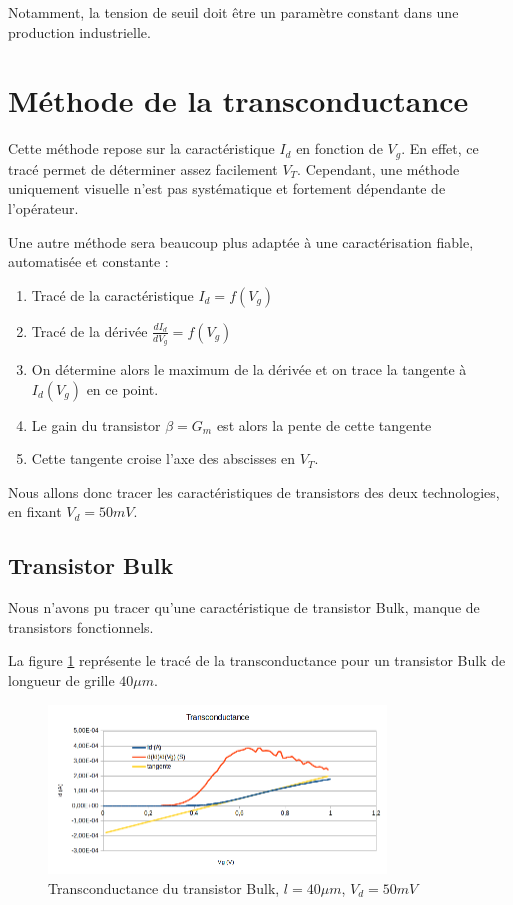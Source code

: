 \documentclass[a4paper,11pt]{report}
\begin{document}
Notamment, la tension de seuil doit être un paramètre constant dans une production industrielle.

\section{Méthode de la transconductance}
Cette méthode repose sur la caractéristique $I_d$ en fonction de $V_g$. En effet, ce tracé permet de déterminer assez facilement $V_T$. Cependant, une méthode uniquement visuelle n'est pas systématique et fortement dépendante de l'opérateur.

Une autre méthode sera beaucoup plus adaptée à une caractérisation fiable, automatisée et constante :
\begin{enumerate}
    \item Tracé de la caractéristique $I_d = f(V_g)$
    \item Tracé de la dérivée $\frac{d I_d}{d V_g} = f(V_g)$
    \item On détermine alors le maximum de la dérivée et on trace la tangente à $I_d(V_g)$ en ce point.
    \item Le gain du transistor $\beta = G_m$ est alors la pente de cette tangente
    \item Cette tangente croise l'axe des abscisses en $V_T$.
\end{enumerate}

Nous allons donc tracer les caractéristiques de transistors des deux technologies, en fixant $V_d = 50mV$.

\subsection{Transistor Bulk}
Nous n'avons pu tracer qu'une caractéristique de transistor Bulk, manque de transistors fonctionnels.

La figure \ref{transconductance bulk} représente le tracé de la transconductance pour un transistor Bulk de longueur de grille $40\mu m$.

\begin{figure}[h]
    \begin{center}
        \includegraphics[width=0.8\textwidth]{Images/Bulk40-Transconductance}
        \caption{Transconductance du transistor Bulk, $l=40\mu m$, $V_d = 50mV$}
        \label{transconductance bulk}
    \end{center}
\end{figure}
\end{document}
